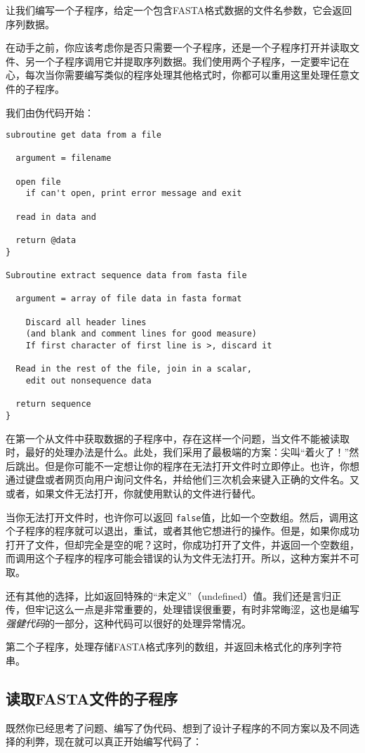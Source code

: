让我们编写一个子程序，给定一个包含FASTA格式数据的文件名参数，它会返回序列数据。

在动手之前，你应该考虑你是否只需要一个子程序，还是一个子程序打开并读取文件、另一个子程序调用它并提取序列数据。我们使用两个子程序，一定要牢记在心，每次当你需要编写类似的程序处理其他格式时，你都可以重用这里处理任意文件的子程序。

我们由伪代码开始：

\begin{lstlisting}
subroutine get data from a file

  argument = filename

  open file
    if can't open, print error message and exit

  read in data and 

  return @data
}

Subroutine extract sequence data from fasta file

  argument = array of file data in fasta format

    Discard all header lines
    (and blank and comment lines for good measure)
    If first character of first line is >, discard it

  Read in the rest of the file, join in a scalar,
    edit out nonsequence data

  return sequence
}
\end{lstlisting}

在第一个从文件中获取数据的子程序中，存在这样一个问题，当文件不能被读取时，最好的处理办法是什么。此处，我们采用了最极端的方案：尖叫“着火了！”然后跳出。但是你可能不一定想让你的程序在无法打开文件时立即停止。也许，你想通过键盘或者网页向用户询问文件名，并给他们三次机会来键入正确的文件名。又或者，如果文件无法打开，你就使用默认的文件进行替代。

当你无法打开文件时，也许你可以返回 \verb|false|值，比如一个空数组。然后，调用这个子程序的程序就可以退出，重试，或者其他它想进行的操作。但是，如果你成功打开了文件，但却完全是空的呢？这时，你成功打开了文件，并返回一个空数组，而调用这个子程序的程序可能会错误的认为文件无法打开。所以，这种方案并不可取。

还有其他的选择，比如返回特殊的“未定义”（undefined）值。我们还是言归正传，但牢记这么一点是非常重要的，处理错误很重要，有时非常晦涩，这也是编写\textit{强健代码}的一部分，这种代码可以很好的处理异常情况。

第二个子程序，处理存储FASTA格式序列的数组，并返回未格式化的序列字符串。

\subsection{读取FASTA文件的子程序}
既然你已经思考了问题、编写了伪代码、想到了设计子程序的不同方案以及不同选择的利弊，现在就可以真正开始编写代码了：

